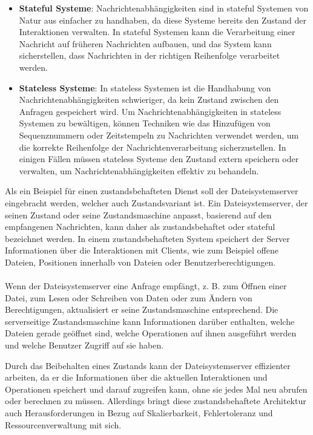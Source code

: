 \documentclass[../vs-script-first-v01.tex]{subfiles}
\begin{document}
\begin{itemize}  
\item \textbf{Stateful Systeme}: Nachrichtenabhängigkeiten sind in stateful Systemen von Natur aus einfacher zu handhaben, da diese Systeme bereits den Zustand der Interaktionen verwalten. In stateful Systemen kann die Verarbeitung einer Nachricht auf früheren Nachrichten aufbauen, und das System kann sicherstellen, dass Nachrichten in der richtigen Reihenfolge verarbeitet werden.
\item \textbf{Stateless Systeme}: In stateless Systemen ist die Handhabung von Nachrichtenabhängigkeiten schwieriger, da kein Zustand zwischen den Anfragen gespeichert wird. Um Nachrichtenabhängigkeiten in stateless Systemen zu bewältigen, können Techniken wie das Hinzufügen von Sequenznummern oder Zeitstempeln zu Nachrichten verwendet werden, um die korrekte Reihenfolge der Nachrichtenverarbeitung sicherzustellen. In einigen Fällen müssen stateless Systeme den Zustand extern speichern oder verwalten, um Nachrichtenabhängigkeiten effektiv zu behandeln.
\end{itemize}  

Als ein Beispiel für einen zustandsbehafteten Dienst soll der Dateisystemserver eingebracht werden, welcher auch Zustandsvariant ist.  Ein Dateisystemserver, der seinen Zustand oder seine Zustandsmaschine anpasst, basierend auf den empfangenen Nachrichten, kann daher als zustandsbehaftet oder stateful bezeichnet werden. In einem zustandsbehafteten System speichert der Server Informationen über die Interaktionen mit Clients, wie zum Beispiel offene Dateien, Positionen innerhalb von Dateien oder Benutzerberechtigungen.
\\\\
Wenn der Dateisystemserver eine Anfrage empfängt, z. B. zum Öffnen einer Datei, zum Lesen oder Schreiben von Daten oder zum Ändern von Berechtigungen, aktualisiert er seine Zustandsmaschine entsprechend. Die serverseitige Zustandsmaschine kann Informationen darüber enthalten, welche Dateien gerade geöffnet sind, welche Operationen auf ihnen ausgeführt werden und welche Benutzer Zugriff auf sie haben.

Durch das Beibehalten eines Zustands kann der Dateisystemserver effizienter arbeiten, da er die Informationen über die aktuellen Interaktionen und Operationen speichert und darauf zugreifen kann, ohne sie jedes Mal neu abrufen oder berechnen zu müssen. Allerdings bringt diese zustandsbehaftete Architektur auch Herausforderungen in Bezug auf Skalierbarkeit, Fehlertoleranz und Ressourcenverwaltung mit sich.
\end{document}
